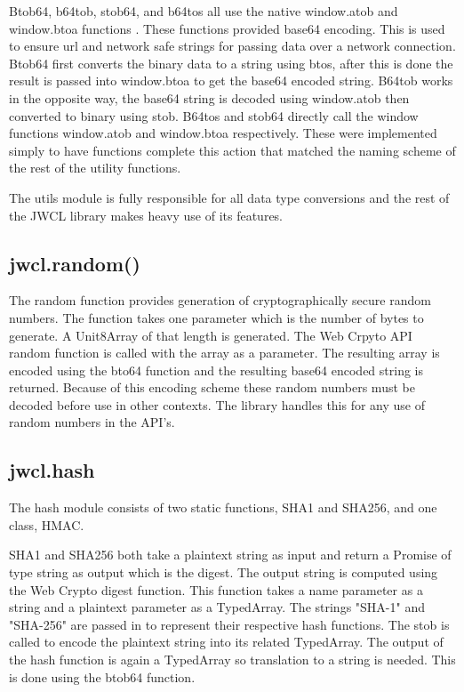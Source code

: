 Btob64, b64tob, stob64, and b64tos all use the native window.atob and window.btoa functions \cite{mdn-base}. These functions provided base64 encoding. This is used to ensure url and network safe strings for passing data over a network connection. Btob64 first converts the binary data to a string using btos, after this is done the result is passed into window.btoa to get the base64 encoded string. B64tob works in the opposite way, the base64 string is decoded using window.atob then converted to binary using stob. B64tos and stob64 directly call the window functions window.atob and window.btoa respectively. These were implemented simply to have functions complete this action that matched the naming scheme of the rest of the utility functions.


The utils module is fully responsible for all data type conversions and the rest of the JWCL library makes heavy use of its features.


\subsection{jwcl.random()}


The random function provides generation of cryptographically secure random numbers. The function takes one parameter which is the number of bytes to generate. A Unit8Array of that length is generated. The Web Crpyto API random function is called with the array as a parameter. The resulting array is encoded using the bto64 function and the resulting base64 encoded string is returned. Because of this encoding scheme these random numbers must be decoded before use in other contexts. The library handles this for any use of random numbers in the API's.


\subsection{jwcl.hash}


The hash module consists of two static functions, SHA1 and SHA256, and one class, HMAC.


SHA1 and SHA256 both take a plaintext string as input and return a Promise of type string as output which is the digest. The output string is computed using the Web Crypto digest function. This function takes a name parameter as a string and a plaintext parameter as a TypedArray. The strings "SHA-1" and "SHA-256" are passed in to represent their respective hash functions. The stob is called to encode the plaintext string into its related TypedArray. The output of the hash function is again a TypedArray so translation to a string is needed. This is done using the btob64 function.


